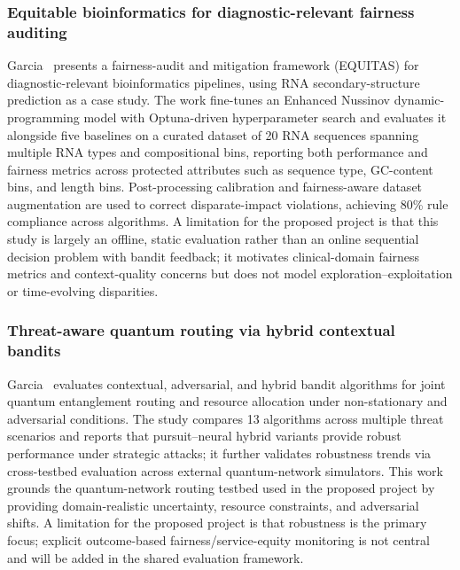 \documentclass[conference]{IEEEtran}
\begin{document}
\subsubsection{Equitable bioinformatics for diagnostic-relevant fairness auditing}
Garcia~\cite{garcia2025equitable_bioinformatics} presents a fairness-audit and
mitigation framework (EQUITAS) for diagnostic-relevant bioinformatics pipelines, using RNA
secondary-structure prediction as a case study. The work fine-tunes an Enhanced Nussinov
dynamic-programming model with Optuna-driven hyperparameter search and evaluates it alongside
five baselines on a curated dataset of 20 RNA sequences spanning multiple RNA types and
compositional bins, reporting both performance and fairness metrics across protected attributes
such as sequence type, GC-content bins, and length bins. Post-processing calibration and
fairness-aware dataset augmentation are used to correct disparate-impact violations, achieving
80\% rule compliance across algorithms. A limitation for the proposed project is that this
study is largely an offline, static evaluation rather than an online sequential decision problem
with bandit feedback; it motivates clinical-domain fairness metrics and context-quality concerns
but does not model exploration--exploitation or time-evolving disparities.

\subsubsection{Threat-aware quantum routing via hybrid contextual bandits}
Garcia~\cite{garcia2026threat_aware_quantum_routing} evaluates contextual, adversarial,
and hybrid bandit algorithms for joint quantum entanglement routing and resource allocation
under non-stationary and adversarial conditions. The study compares 13 algorithms across
multiple threat scenarios and reports that pursuit--neural hybrid variants provide robust
performance under strategic attacks; it further validates robustness trends via cross-testbed
evaluation across external quantum-network simulators. This work grounds the quantum-network
routing testbed used in the proposed project by providing domain-realistic uncertainty, resource
constraints, and adversarial shifts. A limitation for the proposed project is that robustness is
the primary focus; explicit outcome-based fairness/service-equity monitoring is not central and
will be added in the shared evaluation framework.
\end{document}
